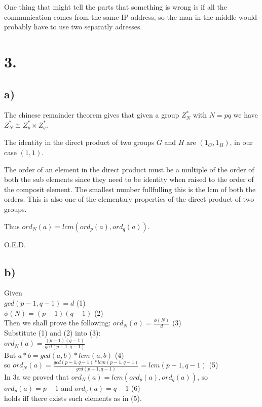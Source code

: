 \documentclass[a4paper,11pt]{article}
\begin{document}
	One thing that might tell the parts that something is wrong is if all the communication 
	comes from the same IP-address, so the man-in-the-middle would probably have to use two
	separatly adresses.


	\section*{3. }
	\subsection*{a) }
	
	The chinese remainder theorem gives that given a group $Z^*_N$ with $N=pq$ we have
	$Z^*_N \cong Z^*_p \times Z^*_q$.

	The identity in the direct product of two groups $G$ and $H$ are $(1_G, 1_H)$, in our
	case $(1, 1)$.

	The order of an element in the direct product must be a multiple of
	the order of both the sub elements since they need to be identity when raised to the
	order of the composit element. The smallest number fullfulling this is the lcm of
	both the orders.
	This is also one of the elementary properties of the direct product of two groups.

	Thus $ ord_N(a) = lcm(ord_p(a), ord_q(a)) $.

	O.E.D.

	\subsection*{b) }
	Given\\
	$gcd(p-1, q-1) = d$ (1)\\
	$\phi(N) = (p-1)(q-1)$ (2)\\
	Then we shall prove the following:
	$ord_N(a) = \frac{\phi(N)}{d}$ (3)\\
	Substitute (1) and (2) into (3):\\
	$ ord_N(a) = \frac{(p-1)(q-1)}{gcd(p-1, q-1)} $\\ 
	But $ a*b = gcd(a, b) * lcm(a, b)$ (4) \\
	so $ ord_N(a) = \frac{gcd(p-1, q-1)*lcm(p-1, q-1)}{gcd(p-1, q-1)} = lcm(p-1, q-1)$ (5)\\
	
	In 3a we proved that $ ord_N(a) = lcm(ord_p(a), ord_q(a)) $, so
	$ord_p(a) = p-1 $ and $ord_q(a) = q-1$ (6) \\
	holds iff there exists such elements as in (5).
\end{document}
